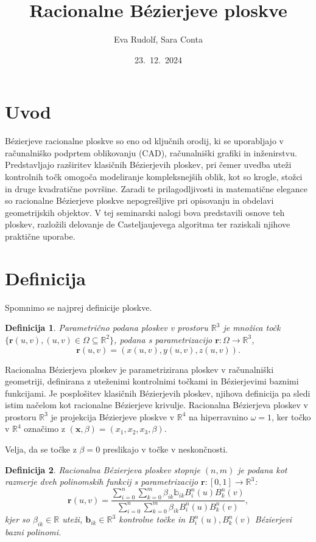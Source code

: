 \documentclass[a4paper,10pt]{article}
\title{Racionalne Bézierjeve ploskve}
\author{Eva Rudolf, Sara Conta}
\date{23.\ 12.\ 2024}
\newtheorem{definicija}{Definicija}
\begin{document}
\maketitle

\newpage

\section{Uvod}

Bézierjeve racionalne ploskve so eno od ključnih orodij, ki se uporabljajo v računalniško podprtem oblikovanju (CAD), računalniški grafiki in inženirstvu. Predstavljajo razširitev klasičnih Bézierjevih ploskev, pri čemer uvedba uteži kontrolnih točk omogoča modeliranje kompleksnejših oblik, kot so krogle, stožci in druge kvadratične površine. Zaradi te prilagodljivosti in matematične elegance so racionalne Bézierjeve ploskve nepogrešljive pri opisovanju in obdelavi geometrijskih objektov. V tej seminarski nalogi bova predstavili osnove teh ploskev, razložili delovanje de Casteljaujevega algoritma ter raziskali njihove praktične uporabe.

\section{Definicija}

Spomnimo se najprej definicije ploskve.

\begin{definicija}
    Parametrično podana ploskev v prostoru $\mathbb{R} ^ 3$ je množica točk $ \{ \textbf{r} (u,v), (u,v) \in \Omega \subseteq \mathbb{R}^2 \} $, podana s parametrizacijo $\mathbf{r} : \Omega \rightarrow \mathbb{R}^3$, 
    $$
    \mathbf{r} (u,v) = (x(u,v), y(u,v), z(u,v)).
    $$
\end{definicija}

Racionalna Bézierjeva ploskev je parametrizirana ploskev v računalniški geometriji, definirana z uteženimi kontrolnimi točkami in Bézierjevimi baznimi funkcijami. Je posplošitev klasičnih Bézierjevih ploskev, njihova definicija pa sledi istim načelom kot racionalne Bézierjeve krivulje. Racionalna Bézierjeva ploskev v prostoru $\mathbb{R}^3$ je projekcija Bézierjeve ploskve v $\mathbb{R}^4$ na hiperravnino $\omega = 1$, ker točko v $\mathbb{R}^4$ označimo z $(\mathbf{x}, \beta) = (x_1, x_2, x_3, \beta)$.

Velja, da se točke z $\beta = 0$ preslikajo v točke v neskončnosti.

\begin{definicija}
    Racionalna Bézierjeva ploskev stopnje $(n, m)$ je podana kot razmerje dveh polinomskih funkcij s parametrizacijo $\mathbf{r}: [0,1] \rightarrow \mathbb{R}^3$:
    $$
    \mathbf{r} (u, v) = \frac{ \sum_{i=0}^{n} \sum_{k=0}^{m} \beta_{ik} \mathbb{b}_{ik} B_i^{n} (u) B_k^{n} (v) }{ \sum_{i=0}^{n} \sum_{k=0}^{m} \beta_{ik} B_i^{n} (u) B_k^{n} (v) } ,
    $$
    kjer so $\beta_{ik} \in \mathbb{R}$ uteži, $\mathbf{b}_{ik} \in \mathbb{R}^3$ kontrolne točke in $B_i^{n} (u), B_k^{n} (v)$ Bézierjevi bazni polinomi.
\end{definicija}
\end{document}
